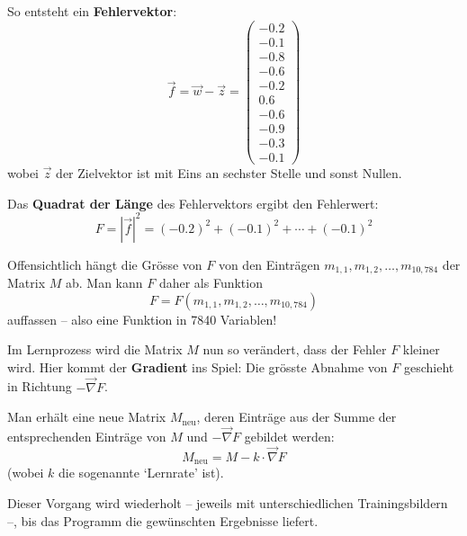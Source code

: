 \medskip

So entsteht ein \textbf{Fehlervektor}:
\[
	\vec{f} = \vec{w} - \vec{z} =
	\begin{pmatrix}
		-0.2 \\
		-0.1 \\
		-0.8 \\
		-0.6 \\
		-0.2 \\
		0.6  \\
		-0.6 \\
		-0.9 \\
		-0.3 \\
		-0.1
	\end{pmatrix}
\]
wobei \( \vec{z} \) der Zielvektor ist mit Eins an sechster Stelle und sonst Nullen.

\medskip

Das \textbf{Quadrat der Länge} des Fehlervektors ergibt den Fehlerwert:
\[
	F = |\vec{f}|^2 = (-0.2)^2 + (-0.1)^2 + \cdots + (-0.1)^2
\]

Offensichtlich hängt die Grösse von \( F \) von den Einträgen $m_{1,1}, m_{1,2}, \dotsc, m_{10,784}$ der Matrix \( M \) ab.
Man kann \( F \) daher als Funktion
\[
	F = F\left(m_{1,1}, m_{1,2}, \dotsc, m_{10,784}\right)
\]
auffassen – also eine Funktion in 7840 Variablen!

\medskip

Im Lernprozess wird die Matrix \( M \) nun so verändert, dass der Fehler \( F \) kleiner wird.
Hier kommt der \textbf{Gradient} ins Spiel:
Die grösste Abnahme von \( F \) geschieht in Richtung \( -\vec{\nabla}F \).

\medskip

Man erhält eine neue Matrix \( M_{\text{neu}} \), deren Einträge aus der Summe der entsprechenden Einträge von \( M \) und \( -\vec{\nabla}F \) gebildet werden:
\[
	M_{\text{neu}} = M - k \cdot \vec{\nabla}F
\]
(wobei \( k \) die sogenannte `Lernrate' ist).

\medskip

Dieser Vorgang wird wiederholt – jeweils mit unterschiedlichen Trainingsbildern –, bis das Programm die gewünschten Ergebnisse liefert.















